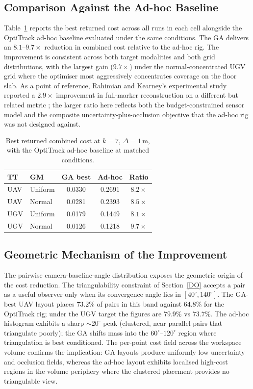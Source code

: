 \subsection{Comparison Against the Ad-hoc Baseline}
Table~\ref{tab:headline} reports the best returned cost across all runs in each cell alongside the OptiTrack ad-hoc baseline evaluated under the same conditions. The GA delivers an $8.1$--$9.7\times$ reduction in combined cost relative to the ad-hoc rig. The improvement is consistent across both target modalities and both grid distributions, with the largest gain ($9.7\times$) under the normal-concentrated UGV grid where the optimiser most aggressively concentrates coverage on the floor slab. As a point of reference, Rahimian and Kearney's experimental study reported a $2.9\times$ improvement in full-marker reconstruction on a different but related metric \cite{rahimian_optimal_2017}; the larger ratio here reflects both the budget-constrained sensor model and the composite uncertainty-plus-occlusion objective that the ad-hoc rig was not designed against.

\begin{table}[t]
\centering
\caption{Best returned combined cost at $k=7$, $\Delta=1\,\text{m}$, with the OptiTrack ad-hoc baseline at matched conditions.}
\label{tab:headline}
\begin{tabular}{l l c c c}
\hline
\textbf{TT} & \textbf{GM} & \textbf{GA best} & \textbf{Ad-hoc} & \textbf{Ratio} \\
\hline
UAV & Uniform & 0.0330 & 0.2691 & $8.2\times$ \\
UAV & Normal  & 0.0281 & 0.2393 & $8.5\times$ \\
UGV & Uniform & 0.0179 & 0.1449 & $8.1\times$ \\
UGV & Normal  & 0.0126 & 0.1218 & $9.7\times$ \\
\hline
\end{tabular}
\end{table}

\subsection{Geometric Mechanism of the Improvement}
The pairwise camera-baseline-angle distribution exposes the geometric origin of the cost reduction. The triangulability constraint of Section~\ref{DO} accepts a pair as a useful observer only when its convergence angle lies in $[40^\circ,140^\circ]$. The GA-best UAV layout places $73.2\%$ of pairs in this band against $64.8\%$ for the OptiTrack rig; under the UGV target the figures are $79.9\%$ vs $73.7\%$. The ad-hoc histogram exhibits a sharp $\sim 20^\circ$ peak (clustered, near-parallel pairs that triangulate poorly); the GA shifts mass into the $60^\circ$--$120^\circ$ region where triangulation is best conditioned. The per-point cost field across the workspace volume confirms the implication: GA layouts produce uniformly low uncertainty and occlusion fields, whereas the ad-hoc layout exhibits localised high-cost regions in the volume periphery where the clustered placement provides no triangulable view.

